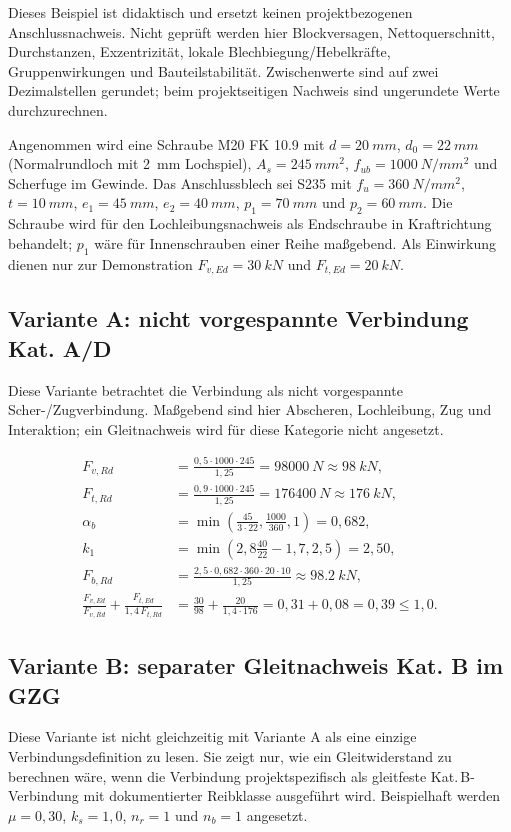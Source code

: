 \documentclass[10pt,a4paper]{article}
\begin{document}
\begin{hinweisbox}
Dieses Beispiel ist didaktisch und ersetzt keinen projektbezogenen Anschlussnachweis. Nicht geprüft werden hier Blockversagen, Nettoquerschnitt, Durchstanzen, Exzentrizität, lokale Blechbiegung/Hebelkräfte, Gruppenwirkungen und Bauteilstabilität. Zwischenwerte sind auf zwei Dezimalstellen gerundet; beim projektseitigen Nachweis sind ungerundete Werte durchzurechnen.
\end{hinweisbox}

Angenommen wird eine Schraube M20 FK 10.9 mit $d=\SI{20}{mm}$, $d_0=\SI{22}{mm}$ (Normalrundloch mit \SI{2}{mm} Lochspiel), $A_s=\SI{245}{mm^2}$, $f_{ub}=\SI{1000}{N/mm^2}$ und Scherfuge im Gewinde. Das Anschlussblech sei S235 mit $f_u=\SI{360}{N/mm^2}$, $t=\SI{10}{mm}$, $e_1=\SI{45}{mm}$, $e_2=\SI{40}{mm}$, $p_1=\SI{70}{mm}$ und $p_2=\SI{60}{mm}$. Die Schraube wird für den Lochleibungsnachweis als Endschraube in Kraftrichtung behandelt; $p_1$ wäre für Innenschrauben einer Reihe maßgebend. Als Einwirkung dienen nur zur Demonstration $F_{v,Ed}=\SI{30}{kN}$ und $F_{t,Ed}=\SI{20}{kN}$.

\subsection*{Variante A: nicht vorgespannte Verbindung Kat. A/D}
Diese Variante betrachtet die Verbindung als nicht vorgespannte Scher-/Zugverbindung. Maßgebend sind hier Abscheren, Lochleibung, Zug und Interaktion; ein Gleitnachweis wird für diese Kategorie nicht angesetzt.

\begin{align*}
F_{v,Rd} &= \frac{0{,}5\cdot1000\cdot245}{1{,}25}=\SI{98000}{N}\approx\SI{98}{kN},\\
F_{t,Rd} &= \frac{0{,}9\cdot1000\cdot245}{1{,}25}=\SI{176400}{N}\approx\SI{176}{kN},\\
\alpha_b &= \min\left(\frac{45}{3\cdot22},\frac{1000}{360},1\right)=0{,}682,\\
k_1 &= \min\left(2{,}8\frac{40}{22}-1{,}7,2{,}5\right)=2{,}50,\\
F_{b,Rd} &= \frac{2{,}5\cdot0{,}682\cdot360\cdot20\cdot10}{1{,}25}\approx\SI{98,2}{kN},\\
\frac{F_{v,Ed}}{F_{v,Rd}}+\frac{F_{t,Ed}}{1{,}4\,F_{t,Rd}}
&= \frac{30}{98}+\frac{20}{1{,}4\cdot176}=0{,}31+0{,}08=0{,}39\leq1{,}0.
\end{align*}

\subsection*{Variante B: separater Gleitnachweis Kat. B im GZG}
Diese Variante ist nicht gleichzeitig mit Variante A als eine einzige Verbindungsdefinition zu lesen. Sie zeigt nur, wie ein Gleitwiderstand zu berechnen wäre, wenn die Verbindung projektspezifisch als gleitfeste Kat.\,B-Verbindung mit dokumentierter Reibklasse ausgeführt wird. Beispielhaft werden $\mu=0{,}30$, $k_s=1{,}0$, $n_r=1$ und $n_b=1$ angesetzt.
\end{document}
